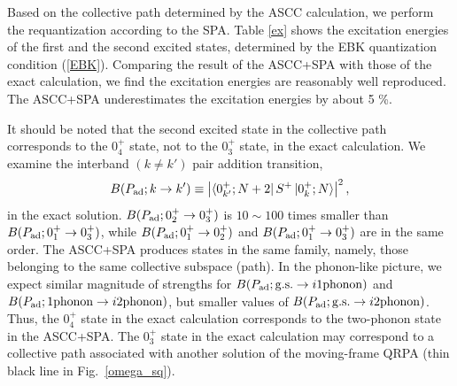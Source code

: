 \documentclass[%
superscriptaddress,
showpacs,
nofootinbib,
amsmath,amssymb,
aps,
prc,
twocolumn,
floatfix ]%
{revtex4-1}
\begin{document}
Based on the collective path determined by the ASCC calculation,
we perform the requantization according to the SPA.
Table \ref{ex} shows the excitation energies of the first and the second
excited states, determined by the EBK quantization condition (\ref{EBK}).
Comparing the result of the ASCC+SPA with those of the exact calculation,
we find the excitation energies are reasonably well reproduced. 
The ASCC+SPA underestimates the excitation energies by about 5 \%.

It should be noted that the second excited state in the collective path
corresponds to the $0_4^+$ state,
not to the $0_3^+$ state, in the exact calculation. 
We examine the interband $(k\neq k')$ pair addition transition,
\begin{equation}
B(P_{\rm ad};k\rightarrow k') \equiv 
	\left|\bra{0_{k'}^+;N+2} S^+ \ket{0_k^+;N}\right|^2 ,
\label{BPad}
\end{equation}
in the exact solution.
$B(P_{\rm ad};0_2^+\rightarrow 0_3^+)$ 
is $10\sim100$ times smaller than $B(P_{\rm ad};0_1^+\rightarrow 0_3^+)$,
while $B(P_{\rm ad};0_1^+\rightarrow 0_2^+)$ and
$B(P_{\rm ad};0_1^+\rightarrow 0_3^+)$ are in the same order.
The ASCC+SPA produces states in the same family,
namely, those belonging to the same collective subspace (path).
In the phonon-like picture,
we expect similar magnitude of strengths for
$B(P_{\rm ad};{\rm g.s.}\rightarrow i{\rm 1 phonon})$
and
$B(P_{\rm ad};{\rm 1 phonon}\rightarrow i{\rm 2 phonon})$,
but smaller values of
$B(P_{\rm ad};{\rm g.s.}\rightarrow i{\rm 2 phonon})$.
Thus, the $0_4^+$ state in the exact calculation
corresponds to the two-phonon state in the ASCC+SPA.
The $0_3^+$ state in the exact calculation may correspond to
a collective path associated with another solution of the moving-frame QRPA
(thin black line in Fig.~\ref{omega_sq}).

\end{document}
